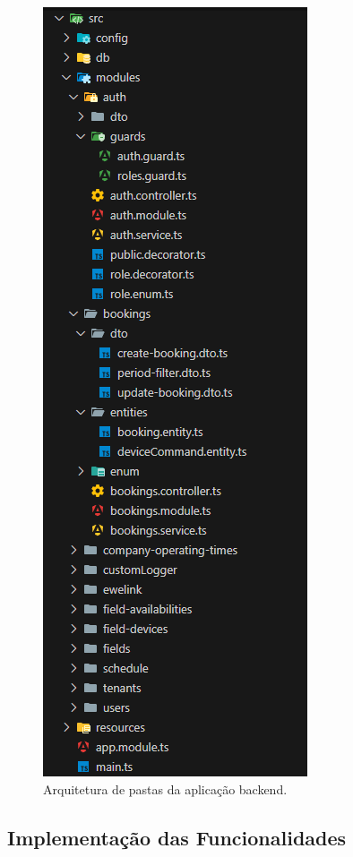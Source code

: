 \begin{figure}[htp]
	\caption{\label{fig:arquitetura_pastas}Arquitetura de pastas da aplicação backend.}
	\begin{center}
	  \includegraphics[scale=0.5]{images/cap5/arq_pastas.png}
	\end{center}
\end{figure}

\subsection{Implementação das Funcionalidades}\label{subsec:implementacao_funcionalidades}

